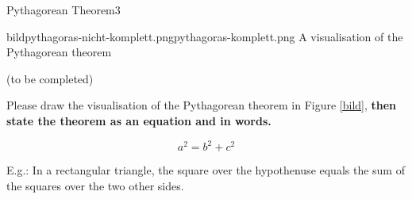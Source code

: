 \begin{question}{Pythagorean Theorem}{3}

\begin{swapimage}{bild}{pythagoras-nicht-komplett.png}{pythagoras-komplett.png}
	A visualisation of the Pythagorean theorem \begin{hide}(to be completed)\end{hide}
\end{swapimage}

Please draw the visualisation of the  Pythagorean theorem in Figure \ref{bild},  \textbf{then state the theorem as an equation and in words.} 


\end{question}

\begin{answer}

$$ a^2=b^2+c^2 $$

E.g.: In a rectangular triangle, the square over the hypothenuse equals the sum of the squares over the two other sides.   

\end{answer}